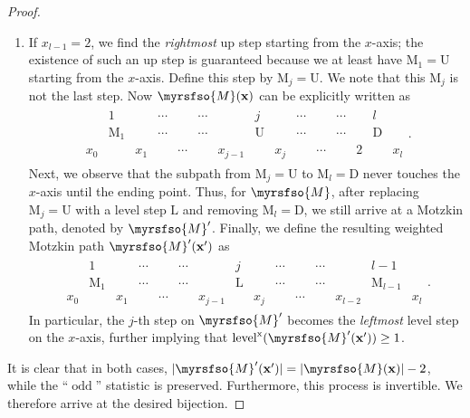 \documentclass[12pt,reqno]{amsart}
\numberwithin{equation}{section}
\theoremstyle{theorem}
\theoremstyle{definition}
\theoremstyle{named}
\newcommand{\odd}{\operatorname{odd}}
\newcommand{\level}{\operatorname{level}}
\newcommand{\x}{\operatorname{x}}
\newcommand{\cM}{\myrsfso{M}}
\newcommand{\bfx}{\mathbf{x}}
\newcommand{\rmM}{\mathrm{M}}
\newcommand{\rU}{\mathrm{U}}
\newcommand{\rD}{\mathrm{D}}
\newcommand{\rL}{\mathrm{L}}
\begin{document}
\begin{proof}
\begin{enumerate}[label={\textup{(\arabic{*})}}, leftmargin=*, labelsep=5pt, align=left, itemsep=2pt, topsep=2pt, parsep=2pt]
		\item If $x_{l-1}= 2$, we find the \emph{rightmost} up step starting from the $x$-axis; the existence of such an up step is guaranteed because we at least have $\rmM_1 = \rU$ starting from the $x$-axis. Define this step by $\rmM_j = \rU$. We note that this $\rmM_j$ is not the last step. Now $\cM(\bfx)$ can be explicitly written as
		\begin{align*}
			\begin{array}{ccccccccccccccc}
				& 1 & & \cdots & & \cdots & & j & & \cdots & & \cdots & & l\\
				& \rmM_1 & & \cdots & & \cdots & & \rU & & \cdots & & \cdots & & \rD\\
				x_0 & & x_1 & & \cdots & & x_{j-1} & & x_j & & \cdots & & 2 & & x_l
			\end{array}.
		\end{align*}
		Next, we observe that the subpath from $\rmM_j = \rU$ to $\rmM_l = \rD$ never touches the $x$-axis until the ending point. Thus, for $\cM$, after replacing $\rmM_j = \rU$ with a level step $\rL$ and removing $\rmM_l = \rD$, we still arrive at a Motzkin path, denoted by $\cM'$. Finally, we define the resulting weighted Motzkin path $\cM'(\bfx')$ as
		\begin{align*}
			\begin{array}{ccccccccccccccc}
				& 1 & & \cdots & & \cdots & & j & & \cdots & & \cdots & & l-1\\
				& \rmM_1 & & \cdots & & \cdots & & \rL & & \cdots & & \cdots & & \rmM_{l-1}\\
				x_0 & & x_1 & & \cdots & & x_{j-1} & & x_j & & \cdots & & x_{l-2} & & x_l
			\end{array}.
		\end{align*}
		In particular, the $j$-th step on $\cM'$ becomes the \emph{leftmost} level step on the $x$-axis, further implying that $\level^{\x}(\cM'(\bfx')) \ge 1$.
	\end{enumerate}
	It is clear that in both cases, $|\cM'(\bfx')| = |\cM(\bfx)|-2$, while the ``$\odd$'' statistic is preserved. Furthermore, this process is invertible. We therefore arrive at the desired bijection.
\end{proof}
\end{document}
